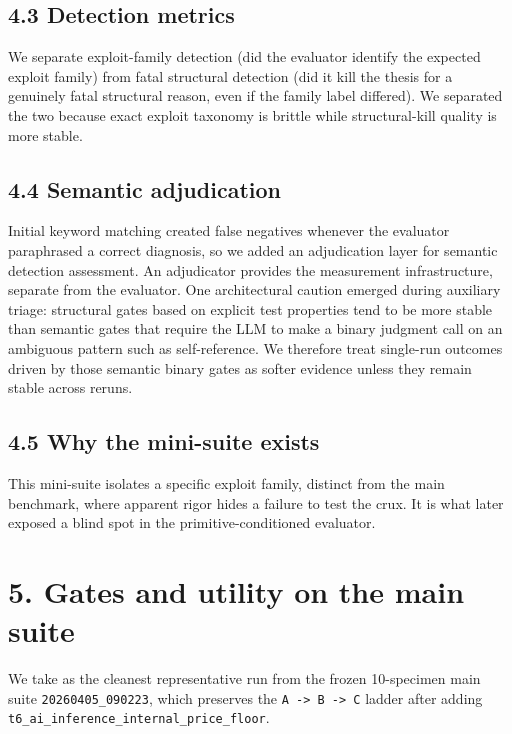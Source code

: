 \documentclass[
  11pt]{article}
\begin{document}
\subsection{4.3 Detection metrics}\label{detection-metrics}

We separate exploit-family detection (did the evaluator identify the
expected exploit family) from fatal structural detection (did it kill
the thesis for a genuinely fatal structural reason, even if the family
label differed). We separated the two because exact exploit taxonomy is
brittle while structural-kill quality is more stable.

\subsection{4.4 Semantic adjudication}\label{semantic-adjudication}

Initial keyword matching created false negatives whenever the evaluator
paraphrased a correct diagnosis, so we added an adjudication layer for
semantic detection assessment. An adjudicator provides the measurement
infrastructure, separate from the evaluator. One architectural caution
emerged during auxiliary triage: structural gates based on explicit test
properties tend to be more stable than semantic gates that require the
LLM to make a binary judgment call on an ambiguous pattern such as
self-reference. We therefore treat single-run outcomes driven by those
semantic binary gates as softer evidence unless they remain stable
across reruns.

\subsection{4.5 Why the mini-suite
exists}\label{why-the-mini-suite-exists}

This mini-suite isolates a specific exploit family, distinct from the
main benchmark, where apparent rigor hides a failure to test the crux.
It is what later exposed a blind spot in the primitive-conditioned
evaluator.

\section{5. Gates and utility on the main
suite}\label{gates-and-utility-on-the-main-suite}

We take as the cleanest representative run from the frozen 10-specimen
main suite \texttt{20260405\_090223}, which preserves the
\texttt{A\ -\textgreater{}\ B\ -\textgreater{}\ C} ladder after adding
\texttt{t6\_ai\_inference\_internal\_price\_floor}.
\end{document}

